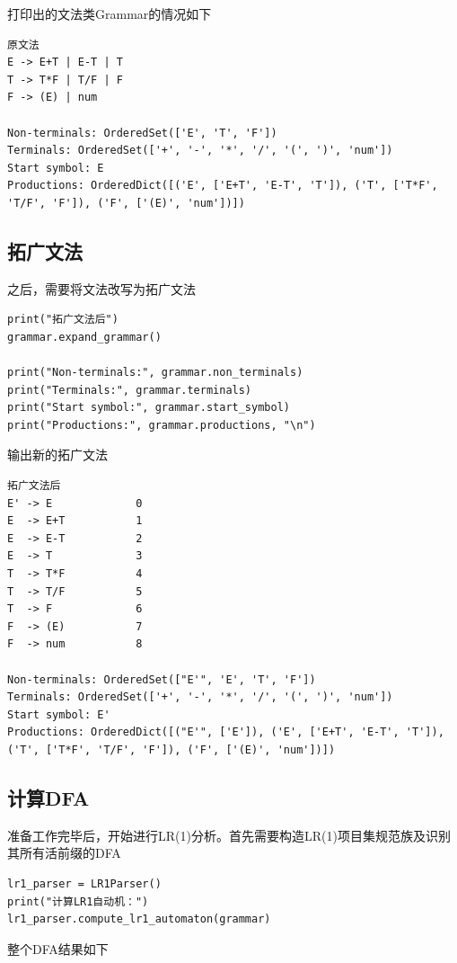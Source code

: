 \documentclass[lang=cn,11pt,a4paper]{elegantpaper}
\begin{document}
打印出的文法类Grammar的情况如下
\begin{lstlisting}[language=text]
原文法
E -> E+T | E-T | T
T -> T*F | T/F | F
F -> (E) | num

Non-terminals: OrderedSet(['E', 'T', 'F'])
Terminals: OrderedSet(['+', '-', '*', '/', '(', ')', 'num'])
Start symbol: E
Productions: OrderedDict([('E', ['E+T', 'E-T', 'T']), ('T', ['T*F', 'T/F', 'F']), ('F', ['(E)', 'num'])]) 
\end{lstlisting}

\subsection{拓广文法}

之后，需要将文法改写为拓广文法
\begin{lstlisting}
print("拓广文法后")
grammar.expand_grammar()

print("Non-terminals:", grammar.non_terminals)
print("Terminals:", grammar.terminals)
print("Start symbol:", grammar.start_symbol)
print("Productions:", grammar.productions, "\n")
\end{lstlisting}

输出新的拓广文法

\begin{lstlisting}[language=text]
拓广文法后
E' -> E             0
E  -> E+T           1
E  -> E-T           2
E  -> T             3
T  -> T*F           4
T  -> T/F           5
T  -> F             6
F  -> (E)           7
F  -> num           8

Non-terminals: OrderedSet(["E'", 'E', 'T', 'F'])
Terminals: OrderedSet(['+', '-', '*', '/', '(', ')', 'num'])
Start symbol: E'
Productions: OrderedDict([("E'", ['E']), ('E', ['E+T', 'E-T', 'T']), ('T', ['T*F', 'T/F', 'F']), ('F', ['(E)', 'num'])])  
\end{lstlisting}

\subsection{计算DFA}

准备工作完毕后，开始进行LR(1)分析。首先需要构造LR(1)项目集规范族及识别其所有活前缀的DFA

\begin{lstlisting}
lr1_parser = LR1Parser()
print("计算LR1自动机：")
lr1_parser.compute_lr1_automaton(grammar)
\end{lstlisting}

整个DFA结果如下
\end{document}

